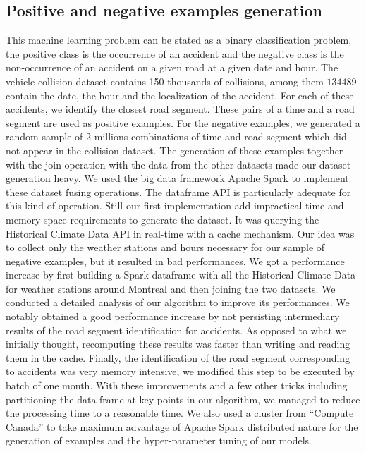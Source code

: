 \documentclass[conference]{IEEEtran}
\begin{document}
\subsection{Positive and negative examples generation}
This machine learning problem can be stated as a binary classification problem, the positive class is the occurrence of an accident and the negative class is the non-occurrence of an accident on a given road at a given date and hour.
The vehicle collision dataset contains 150 thousands of collisions, among them $134 489$ contain the date, the hour and the localization of the accident.
For each of these accidents, we identify the closest road segment.
These pairs of a time and a road segment are used as positive examples.
For the negative examples, we generated a random sample of 2 millions combinations of time and road segment which did not appear in the collision dataset.
 The generation of these examples together with the join operation with the data from the other datasets made our dataset generation heavy. We used the big data framework Apache Spark to implement these dataset fusing operations. The dataframe API is particularly adequate for this kind of operation.
Still our first implementation add impractical time and memory space requirements to generate the dataset.
It was querying the Historical Climate Data API in real-time with a cache mechanism.
Our idea was to collect only the weather stations and hours necessary for our sample of negative examples, but it resulted in bad performances.
We got a performance increase by first building a Spark dataframe with all the Historical Climate Data for weather stations around Montreal and then joining the two datasets.
We conducted a detailed analysis of our algorithm to improve its performances.
We notably obtained a good performance increase by not persisting intermediary results of the road segment identification for accidents.
As opposed to what we initially thought, recomputing these results was faster than writing and reading them in the cache.
Finally, the identification of the road segment corresponding to accidents was very memory intensive, we modified this step to be executed by batch of one month.
 With these improvements and a few other tricks including partitioning the data frame at key points in our algorithm, we managed to reduce the processing time to a reasonable time.
We also used a cluster from “Compute Canada” to take maximum advantage of Apache Spark distributed nature for the generation of examples and the hyper-parameter tuning of our models.
\end{document}
